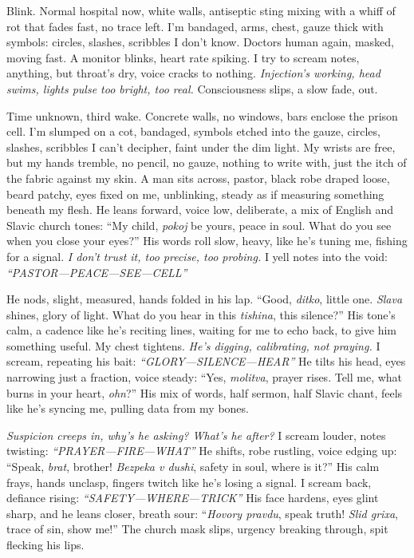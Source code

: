\documentclass[12pt]{article}
\begin{document}
Blink. Normal hospital now, white walls, antiseptic sting mixing with a whiff of rot that fades fast, no trace left. I’m bandaged, arms, chest, gauze thick with symbols: circles, slashes, scribbles I don’t know. Doctors human again, masked, moving fast. A monitor blinks, heart rate spiking. I try to scream notes, anything, but throat’s dry, voice cracks to nothing. \textit{Injection’s working, head swims, lights pulse too bright, too real.} Consciousness slips, a slow fade, out.

Time unknown, third wake. Concrete walls, no windows, bars enclose the prison cell. I’m slumped on a cot, bandaged, symbols etched into the gauze, circles, slashes, scribbles I can’t decipher, faint under the dim light. My wrists are free, but my hands tremble, no pencil, no gauze, nothing to write with, just the itch of the fabric against my skin. A man sits across, pastor, black robe draped loose, beard patchy, eyes fixed on me, unblinking, steady as if measuring something beneath my flesh. He leans forward, voice low, deliberate, a mix of English and Slavic church tones: “My child, \textit{pokoj} be yours, peace in soul. What do you see when you close your eyes?” His words roll slow, heavy, like he’s tuning me, fishing for a signal. \textit{I don’t trust it, too precise, too probing.} I yell notes into the void: \textit{“PASTOR—PEACE—SEE—CELL”}

He nods, slight, measured, hands folded in his lap. “Good, \textit{ditko}, little one. \textit{Slava} shines, glory of light. What do you hear in this \textit{tishina}, this silence?” His tone’s calm, a cadence like he’s reciting lines, waiting for me to echo back, to give him something useful. My chest tightens. \textit{He’s digging, calibrating, not praying.} I scream, repeating his bait: \textit{“GLORY—SILENCE—HEAR”} He tilts his head, eyes narrowing just a fraction, voice steady: “Yes, \textit{molitva}, prayer rises. Tell me, what burns in your heart, \textit{ohn}?” His mix of words, half sermon, half Slavic chant, feels like he’s syncing me, pulling data from my bones.

\textit{Suspicion creeps in, why’s he asking? What’s he after?} I scream louder, notes twisting: \textit{“PRAYER—FIRE—WHAT”} He shifts, robe rustling, voice edging up: “Speak, \textit{brat}, brother! \textit{Bezpeka v dushi}, safety in soul, where is it?” His calm frays, hands unclasp, fingers twitch like he’s losing a signal. I scream back, defiance rising: \textit{“SAFETY—WHERE—TRICK”} His face hardens, eyes glint sharp, and he leans closer, breath sour: “\textit{Hovory pravdu}, speak truth! \textit{Slid grixa}, trace of sin, show me!” The church mask slips, urgency breaking through, spit flecking his lips.
\end{document}
